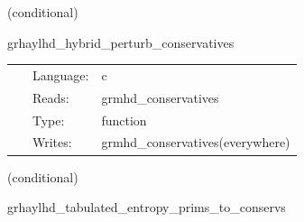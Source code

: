 \documentclass{article}
\begin{document}
\vspace{5mm}

   (conditional) 

\hspace{5mm} grhaylhd\_hybrid\_perturb\_conservatives 

\hspace{5mm}{\it hybrid version of grhaylhd\_perturb\_conservatives } 


\hspace{5mm}

 \begin{tabular*}{160mm}{cll} 
~ & Language:  & c \\ 
~ & Reads:  & grmhd\_conservatives \\ 
~ & Type:  & function \\ 
~ & Writes:  & grmhd\_conservatives(everywhere) \\ 
\end{tabular*} 


\vspace{5mm}

   (conditional) 

\hspace{5mm} grhaylhd\_tabulated\_entropy\_prims\_to\_conservs 

\hspace{5mm}{\it entropy+tabulated version of grhaylhd\_prims\_to\_conservs } 


\hspace{5mm}
\end{document}
